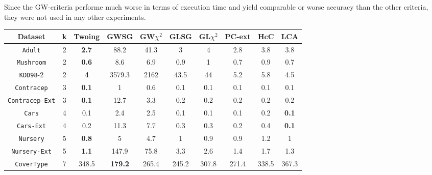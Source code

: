 Since the GW-criteria performe much worse in terms of execution time and yield comparable or worse accuracy than the other criteria, they were not used in any other experiments.

\begin{table}[]
\scriptsize
\centering
\begin{tabular}{c|c|c|c|c|c|c|c|c|c}
Dataset             & k  & Twoing     & GWSG       & GW$\chi^2$  & GLSG      & GL$\chi^2$ & PC-ext     & HcC        & LCA        \\
\hline
{\tt Adult}         & 2  & {\bf 2.7}  & 88.2       & 41.3        & 3         & 4          & 2.8        & 3.8        & 3.8        \\
{\tt Mushroom}      & 2  & {\bf 0.6}  & 8.6        & 6.9         & 0.9       & 1          & 0.7        & 0.9        & 0.7        \\
{\tt KDD98}-2       & 2  & {\bf 4}    & 3579.3     & 2162        & 43.5      & 44         & 5.2        & 5.8        & 4.5        \\
{\tt Contracep}     & 3  & {\bf 0.1}  & 1          & 0.6         & 0.1       & 0.1        & 0.1        & 0.1        & 0.1        \\
{\tt Contracep-Ext} & 3  & {\bf 0.1}  & 12.7       & 3.3         & 0.2       & 0.2        & 0.2        & 0.2        & 0.2        \\
{\tt Cars}          & 4  & 0.1        & 2.4        & 2.5         & 0.1       & 0.1        & 0.1        & 0.2        & {\bf 0.1}  \\
{\tt Cars-Ext}      & 4  & 0.2        & 11.3       & 7.7         & 0.3       & 0.3        & 0.2        & 0.4        & {\bf 0.1}  \\
{\tt Nursery}       & 5  & {\bf 0.8}  & 5          & 4.7         & 1         & 0.9        & 0.9        & 1.2        & 1          \\
{\tt Nursery-Ext}   & 5  & {\bf 1.1}  & 147.9      & 75.8        & 3.3       & 2.6        & 1.4        & 1.7        & 1.3        \\
{\tt CoverType}     & 7  & 348.5      & {\bf 179.2}&  265.4      & 245.2     & 307.8      & 271.4      & 338.5      & 367.3      \\

\end{tabular}
\end{table}
